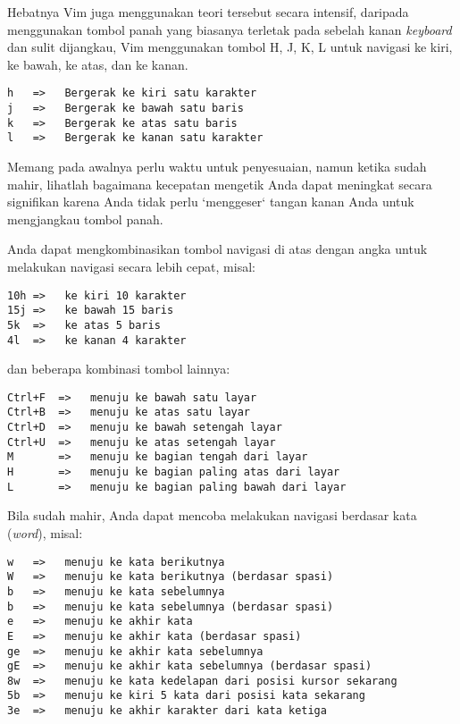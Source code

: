 \documentclass{article}
\begin{document}
Hebatnya Vim juga menggunakan teori tersebut secara
intensif, daripada menggunakan tombol panah yang biasanya
terletak pada sebelah kanan \emph{keyboard} dan sulit
dijangkau, Vim menggunakan tombol H, J, K, L untuk navigasi
ke kiri, ke bawah, ke atas, dan ke kanan. 

\begin{verbatim}
h   =>   Bergerak ke kiri satu karakter
j   =>   Bergerak ke bawah satu baris
k   =>   Bergerak ke atas satu baris
l   =>   Bergerak ke kanan satu karakter
\end{verbatim}

Memang pada awalnya perlu waktu untuk penyesuaian, namun
ketika sudah mahir, lihatlah bagaimana kecepatan mengetik
Anda dapat meningkat secara signifikan karena Anda tidak
perlu `menggeser` tangan kanan Anda untuk mengjangkau tombol
panah.

Anda dapat mengkombinasikan tombol navigasi di atas dengan
angka untuk melakukan navigasi secara lebih cepat, misal:

\begin{verbatim}
10h =>   ke kiri 10 karakter
15j =>   ke bawah 15 baris
5k  =>   ke atas 5 baris
4l  =>   ke kanan 4 karakter
\end{verbatim}

dan beberapa kombinasi tombol lainnya:

\begin{verbatim}
Ctrl+F  =>   menuju ke bawah satu layar
Ctrl+B  =>   menuju ke atas satu layar
Ctrl+D  =>   menuju ke bawah setengah layar
Ctrl+U  =>   menuju ke atas setengah layar
M       =>   menuju ke bagian tengah dari layar
H       =>   menuju ke bagian paling atas dari layar
L       =>   menuju ke bagian paling bawah dari layar
\end{verbatim}

Bila sudah mahir, Anda dapat mencoba melakukan navigasi
berdasar kata (\emph{word}), misal:

\begin{verbatim}
w   =>   menuju ke kata berikutnya
W   =>   menuju ke kata berikutnya (berdasar spasi)
b   =>   menuju ke kata sebelumnya
b   =>   menuju ke kata sebelumnya (berdasar spasi)
e   =>   menuju ke akhir kata
E   =>   menuju ke akhir kata (berdasar spasi)
ge  =>   menuju ke akhir kata sebelumnya
gE  =>   menuju ke akhir kata sebelumnya (berdasar spasi)
8w  =>   menuju ke kata kedelapan dari posisi kursor sekarang
5b  =>   menuju ke kiri 5 kata dari posisi kata sekarang
3e  =>   menuju ke akhir karakter dari kata ketiga
\end{verbatim}
\end{document}
